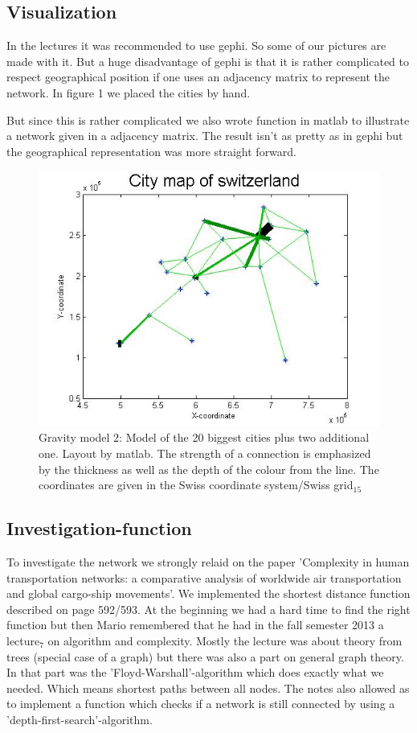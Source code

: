 \documentclass[11pt]{article}
\begin{document}
\subsection{Visualization}
In the lectures it was recommended to use gephi. So some of our pictures are made with it. But a huge disadvantage of gephi is that it is rather complicated to respect geographical position if one uses an adjacency  matrix to represent the network. In figure 1 we placed the cities by hand.

But since this is rather complicated we also wrote function in matlab to illustrate a network given in a adjacency matrix. The result isn't as pretty as in gephi but the geographical representation was more straight forward.


\begin{figure}
\centering
\includegraphics[scale=0.5]{switzerland_network2}
 \caption{Gravity model 2: Model of the 20 biggest cities plus two additional one. Layout by matlab. The strength of a connection is emphasized by the thickness as well as the depth of the colour from the line. The coordinates are given in the Swiss coordinate system/Swiss grid$_{15}$}
\end{figure}

\subsection{Investigation-function}
To investigate the network we strongly relaid on the paper 'Complexity in human transportation networks: a comparative analysis of worldwide air transportation and global cargo-ship movements'.
We implemented the shortest distance function described on page 592/593. At the beginning we had a hard time to find the right function but then Mario remembered that he had in the fall semester 2013 a lecture$_{7}$ on algorithm and complexity. Mostly the lecture was about theory from trees (special case of a graph) but there was also a part on general graph theory. In that part was the 'Floyd-Warshall'-algorithm which does exactly what we needed. Which means shortest paths between all nodes.
The notes also allowed as to implement a function which checks if a network is still connected by using a 'depth-first-search'-algorithm.
\end{document}
